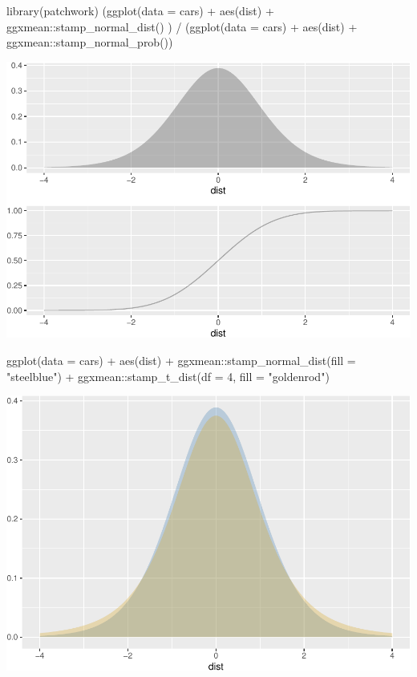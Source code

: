 \documentclass[12pt]{article}
\newenvironment{Shaded}{\begin{snugshade}}{\end{snugshade}}
\newcommand{\AttributeTok}[1]{\textcolor[rgb]{0.77,0.63,0.00}{#1}}
\newcommand{\DecValTok}[1]{\textcolor[rgb]{0.00,0.00,0.81}{#1}}
\newcommand{\FunctionTok}[1]{\textcolor[rgb]{0.00,0.00,0.00}{#1}}
\newcommand{\NormalTok}[1]{#1}
\newcommand{\SpecialCharTok}[1]{\textcolor[rgb]{0.00,0.00,0.00}{#1}}
\newcommand{\StringTok}[1]{\textcolor[rgb]{0.31,0.60,0.02}{#1}}
\begin{document}
\begin{Shaded}
\begin{Highlighting}[]
\FunctionTok{library}\NormalTok{(patchwork)}
\NormalTok{(}\FunctionTok{ggplot}\NormalTok{(}\AttributeTok{data =}\NormalTok{ cars) }\SpecialCharTok{+}
  \FunctionTok{aes}\NormalTok{(dist) }\SpecialCharTok{+}
\NormalTok{  ggxmean}\SpecialCharTok{::}\FunctionTok{stamp\_normal\_dist}\NormalTok{() ) }\SpecialCharTok{/}
\NormalTok{(}\FunctionTok{ggplot}\NormalTok{(}\AttributeTok{data =}\NormalTok{ cars) }\SpecialCharTok{+}
  \FunctionTok{aes}\NormalTok{(dist) }\SpecialCharTok{+}
\NormalTok{  ggxmean}\SpecialCharTok{::}\FunctionTok{stamp\_normal\_prob}\NormalTok{())}
\end{Highlighting}
\end{Shaded}

\begin{center}\includegraphics[width=0.5\linewidth]{skeleton_files/figure-latex/unnamed-chunk-7-1} \end{center}

\begin{Shaded}
\begin{Highlighting}[]
\FunctionTok{ggplot}\NormalTok{(}\AttributeTok{data =}\NormalTok{ cars) }\SpecialCharTok{+} 
  \FunctionTok{aes}\NormalTok{(dist) }\SpecialCharTok{+}
\NormalTok{  ggxmean}\SpecialCharTok{::}\FunctionTok{stamp\_normal\_dist}\NormalTok{(}\AttributeTok{fill =} \StringTok{"steelblue"}\NormalTok{) }\SpecialCharTok{+}
\NormalTok{  ggxmean}\SpecialCharTok{::}\FunctionTok{stamp\_t\_dist}\NormalTok{(}\AttributeTok{df =} \DecValTok{4}\NormalTok{,}
               \AttributeTok{fill =} \StringTok{"goldenrod"}\NormalTok{)}
\end{Highlighting}
\end{Shaded}

\begin{center}\includegraphics[width=0.5\linewidth]{skeleton_files/figure-latex/unnamed-chunk-8-1} \end{center}
\end{document}
